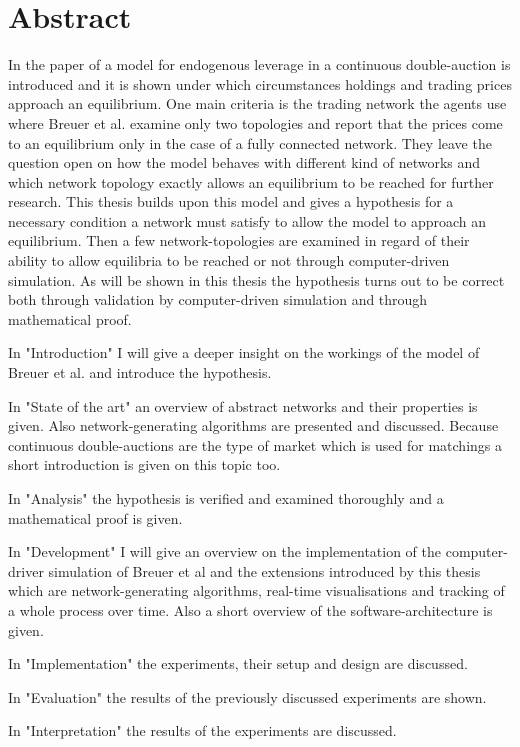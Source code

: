\documentclass[Bachelorarbeit.tex]{subfiles}
\begin{document}
\chapter*{Abstract}
In the paper of \cite{Breuer2015} a model for endogenous leverage in a continuous double-auction is introduced and it is shown under which circumstances holdings and trading prices approach an equilibrium. One main criteria is the trading network the agents use where Breuer et al. examine only two topologies and report that the prices come to an equilibrium only in the case of a fully connected network. They leave the question open on how the model behaves with different kind of networks and which network topology exactly allows an equilibrium to be reached  for further research. This thesis builds upon this model and gives a hypothesis for a necessary condition a network must satisfy to allow the model to approach an equilibrium. Then a few network-topologies are examined in regard of their ability to allow equilibria to be reached or not through computer-driven simulation. As will be shown in this thesis the hypothesis turns out to be correct both through validation by computer-driven simulation and through mathematical proof.

In "Introduction" I will give a deeper insight on the workings of the model of Breuer et al. and introduce the hypothesis.

In "State of the art" an overview of abstract networks and their properties is given. Also network-generating algorithms are presented and discussed. Because continuous double-auctions are the type of market which is used for matchings a short introduction is given on this topic too.

In "Analysis" the hypothesis is verified and examined thoroughly and a mathematical proof is given.

In "Development" I will give an overview on the implementation of the computer-driver simulation of Breuer et al and the extensions introduced by this thesis which are network-generating algorithms, real-time visualisations and tracking of a whole process over time. Also a short overview of the software-architecture is given.

In "Implementation" the experiments, their setup and design are discussed.

In "Evaluation" the results of the previously discussed experiments are shown.

In "Interpretation" the results of the experiments are discussed.
\end{document}
